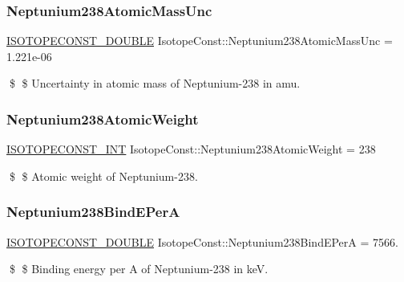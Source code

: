 \subsubsection{\texorpdfstring{Neptunium238\+Atomic\+Mass\+Unc}{Neptunium238AtomicMassUnc}}
{\footnotesize\ttfamily \mbox{\hyperlink{group___isotope_const-_macros_ga8f45a7272ce02c0b4c65c44636ed719a}{I\+S\+O\+T\+O\+P\+E\+C\+O\+N\+S\+T\+\_\+\+D\+O\+U\+B\+LE}} Isotope\+Const\+::\+Neptunium238\+Atomic\+Mass\+Unc = 1.\+221e-\/06}

\$ \$ Uncertainty in atomic mass of Neptunium-\/238 in amu. \mbox{\label{group___isotope_const-_neptunium-_np238_ga21751f1d62ac293f487a7be6ef6e644d}} 
\subsubsection{\texorpdfstring{Neptunium238\+Atomic\+Weight}{Neptunium238AtomicWeight}}
{\footnotesize\ttfamily \mbox{\hyperlink{group___isotope_const-_macros_ga5f18360b3e99483a35c32d789e62621c}{I\+S\+O\+T\+O\+P\+E\+C\+O\+N\+S\+T\+\_\+\+I\+NT}} Isotope\+Const\+::\+Neptunium238\+Atomic\+Weight = 238}

\$ \$ Atomic weight of Neptunium-\/238. \mbox{\label{group___isotope_const-_neptunium-_np238_ga7cf54b6d9bf7d43a48d4b22b0fca5001}} 
\subsubsection{\texorpdfstring{Neptunium238\+Bind\+E\+PerA}{Neptunium238BindEPerA}}
{\footnotesize\ttfamily \mbox{\hyperlink{group___isotope_const-_macros_ga8f45a7272ce02c0b4c65c44636ed719a}{I\+S\+O\+T\+O\+P\+E\+C\+O\+N\+S\+T\+\_\+\+D\+O\+U\+B\+LE}} Isotope\+Const\+::\+Neptunium238\+Bind\+E\+PerA = 7566.}

\$ \$ Binding energy per A of Neptunium-\/238 in keV. \mbox{\label{group___isotope_const-_neptunium-_np238_ga85de26a5c5880499591e86c7f4015169}} 
